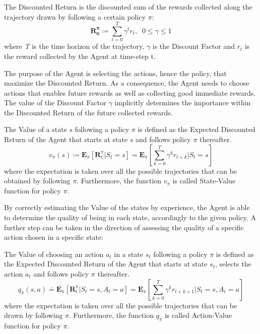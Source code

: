             \begin{definition}
                \label{def:return}
                The Discounted Return is the discounted sum of the rewards collected along the trajectory drawn by following a certain policy $\pi$:
                \[ \mathbf{R_{0}^{\pi}} \coloneqq \sum_{t=0}^{T} \gamma^{t} r_t,  \;\; 0 \leq \gamma \leq 1  \]
                where \textit{T} is the time horizon of the trajectory, $\gamma$ is the Discount Factor and $r_t$ is the reward collected by the Agent at time-step t.
            \end{definition}
            
            The purpose of the Agent is selecting the actions, hence the policy, that maximize the Discounted Return. As a consequence, the Agent needs to choose actions that enables future rewards as well as collecting good immediate rewards. The value of the Discount Factor $\gamma$ implicitly determines the importance within the Discounted Return of the future collected rewards.
            
            \begin{definition}
                \label{def:valuefun}
                The Value of a state $s$ following a policy $\pi$ is defined as the Expected Discounted Return of the Agent that starts at state $s$ and follows policy $\pi$ thereafter. 
                \[ v_{\pi}\left(s\right) \coloneqq \mathbf{E}_{\pi} \left[ \mathbf{R}_{t}^{\pi} | S_{t}=s\right] = \mathbf{E}_{\pi} \left[ \sum_{k=0}^T \gamma^k r_{t + k} | S_{t}=s\right] \]
                where the expectation is taken over all the possible trajectories that can be obtained by following $\pi$.
                Furthermore, the function $v_{\pi}$ is called State-Value function for policy $\pi$.
            \end{definition}
            
            By correctly estimating the Value of the states by experience, the Agent is able to determine the quality of being in each state, accordingly to the given policy. A further step can be taken in the direction of assessing the quality of a specific action chosen in a specific state:
            
            \begin{definition}
                \label{def:actionvaluefun}
                The Value of choosing an action $a_t$ in a state $s_t$ following a policy $\pi$ is defined as the Expected Discounted Return of the Agent that starts at state $s_t$, selects the action $a_t$ and follows policy $\pi$ thereafter. 
                \[ q_{\pi}\left(s,a\right) \doteq \mathbf{E}_{\pi} \left[ \mathbf{R}_{t}^{\pi} | S_{t}=s, A_{t}=a\right] = \mathbf{E}_{\pi} \left[ \sum_{k=0}^T \gamma^k r_{t + k + 1} | S_{t}=s, A_{t}=a\right]\]
                where the expectation is taken over all the possible trajectories that can be drawn by following $\pi$.
                Furthermore, the function $q_{\pi}$ is called Action-Value function for policy $\pi$.
            \end{definition}
            
